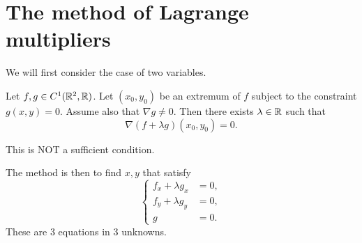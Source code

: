 \section{The method of Lagrange multipliers} \label{sec:lm}
We will first consider the case of two variables.
\begin{proposition*} \label{thm:lm:2}
    Let $f, g \in C^1(\mathbb{R}^2, \mathbb{R})$.
    Let $(x_0, y_0)$ be an extremum of $f$ subject to the constraint
    $g(x, y) = 0$.
    Assume also that $\nabla g \ne 0$.
    Then there exists $\lambda \in \mathbb{R}$ such that \[
        \nabla(f + \lambda g)(x_0, y_0) = 0.
    \]
\end{proposition*}
\begin{remark}
    This is NOT a sufficient condition.
\end{remark}
The method is then to find $x, y$ that satisfy \[
    \left\{\begin{aligned}f_x + \lambda g_x &= 0, \\
    f_y + \lambda g_y &= 0, \\
    g &= 0.
    \end{aligned}\right.
\] These are $3$ equations in $3$ unknowns.

